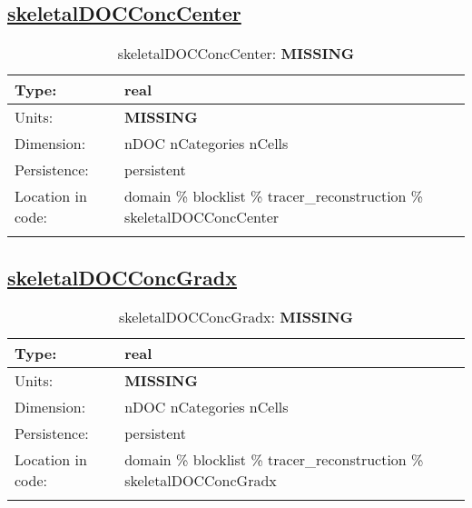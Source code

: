 \subsection[skeletalDOCConcCenter]{\hyperref[sec:var_tab_tracer_reconstruction]{skeletalDOCConcCenter}}
\label{subsec:var_sec_tracer_reconstruction_skeletalDOCConcCenter}
\begin{center}
\begin{longtable}{| p{2.0in} | p{4.0in} |}
        \hline 
        Type: & real \\
        \hline 
        Units: & {\bf \color{red} MISSING} \\
        \hline 
        Dimension: & nDOC nCategories nCells \\
        \hline 
        Persistence: & persistent \\
        \hline 
         Location in code: & domain \% blocklist \% tracer\_reconstruction \% skeletalDOCConcCenter \\
         \hline 
    \caption{skeletalDOCConcCenter: {\bf \color{red} MISSING}}
\end{longtable}
\end{center}
\subsection[skeletalDOCConcGradx]{\hyperref[sec:var_tab_tracer_reconstruction]{skeletalDOCConcGradx}}
\label{subsec:var_sec_tracer_reconstruction_skeletalDOCConcGradx}
\begin{center}
\begin{longtable}{| p{2.0in} | p{4.0in} |}
        \hline 
        Type: & real \\
        \hline 
        Units: & {\bf \color{red} MISSING} \\
        \hline 
        Dimension: & nDOC nCategories nCells \\
        \hline 
        Persistence: & persistent \\
        \hline 
         Location in code: & domain \% blocklist \% tracer\_reconstruction \% skeletalDOCConcGradx \\
         \hline 
    \caption{skeletalDOCConcGradx: {\bf \color{red} MISSING}}
\end{longtable}
\end{center}
